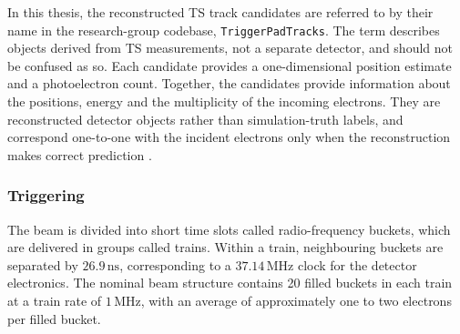 In this thesis, the reconstructed TS track candidates are referred to by
their name in the research-group codebase, \texttt{TriggerPadTracks}. The
term describes objects derived from TS measurements, not a separate detector,
and should not be confused as so. Each
candidate provides a one-dimensional position estimate and a photoelectron
count. Together, the candidates provide information about the positions, energy and the 
multiplicity of the incoming electrons. They are reconstructed detector
objects rather than simulation-truth labels, and correspond one-to-one with
the incident electrons only when the reconstruction makes correct prediction \cite{ldmx2025-overview}.

\subsubsection{Triggering
}




The beam is divided into short time slots called radio-frequency buckets,
which are delivered in groups called trains. Within a train, neighbouring
buckets are separated by \(26.9\,\mathrm{ns}\), corresponding to a
\(37.14\,\mathrm{MHz}\) clock for the detector electronics. The nominal beam
structure contains 20 filled buckets in each train at a train rate of
\(1\,\mathrm{MHz}\), with an average of approximately one to two electrons
per filled bucket. 

